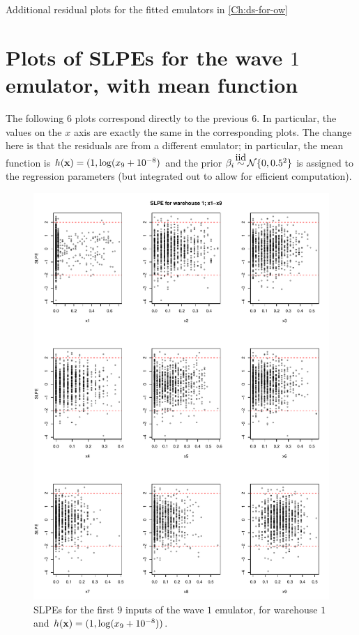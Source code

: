 \begin{chapter}{Additional residual plots  for the fitted emulators in \cref{Ch:ds-for-ow} \label{App:resid}}
\section{Plots of SLPEs for the wave $1$ emulator, with mean function \label{App:resid2}}
The following $6$ plots correspond directly to the previous $6$. In particular, the values on the $x$ axis are exactly the same in the corresponding plots. The change here is that the residuals are from a different emulator; in particular, the mean function is $h(\mathbf{x}) = (1, \log (x_9 + 10^{-8})$ and the prior $\beta_i \iid \mathcal{N}\{0, 0.5^2 \}$ is assigned to the regression parameters (but integrated out to allow for efficient computation).
\begin{figure}
  \centering
  \includegraphics[width=\textwidth]{fig-app-ds/w1-w1-mean1.pdf}
  \caption{SLPEs for the first $9$ inputs of the wave $1$ emulator, for warehouse $1$ and $h(\mathbf{x}) = (1, \log (x_9 + 10^{-8}))$.}
\end{figure}


\end{chapter}
